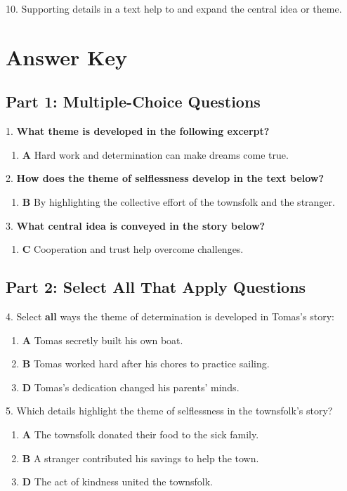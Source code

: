 \documentclass[12pt]{article}
\begin{document}
10. Supporting details in a text help to \underline{\hspace{4cm}} and expand the central idea or theme.  
\vspace{2cm}
\newpage
\section*{Answer Key}

\subsection*{Part 1: Multiple-Choice Questions}

1. \textbf{What theme is developed in the following excerpt?}
\begin{enumerate}[label=\Alph*.]
    \item \textbf{A} Hard work and determination can make dreams come true.
\end{enumerate}

2. \textbf{How does the theme of selflessness develop in the text below?}
\begin{enumerate}[label=\Alph*.]
    \item \textbf{B} By highlighting the collective effort of the townsfolk and the stranger.
\end{enumerate}

3. \textbf{What central idea is conveyed in the story below?}
\begin{enumerate}[label=\Alph*.]
    \item \textbf{C} Cooperation and trust help overcome challenges.
\end{enumerate}

\subsection*{Part 2: Select All That Apply Questions}

4. Select \textbf{all} ways the theme of determination is developed in Tomas’s story:  
\begin{enumerate}[label=\Alph*.]
    \item \textbf{A} Tomas secretly built his own boat.  
    \item \textbf{B} Tomas worked hard after his chores to practice sailing.  
    \item \textbf{D} Tomas’s dedication changed his parents’ minds.  
\end{enumerate}

5. Which details highlight the theme of selflessness in the townsfolk’s story?  
\begin{enumerate}[label=\Alph*.]
    \item \textbf{A} The townsfolk donated their food to the sick family.  
    \item \textbf{B} A stranger contributed his savings to help the town.  
    \item \textbf{D} The act of kindness united the townsfolk.  
\end{enumerate}
\end{document}
